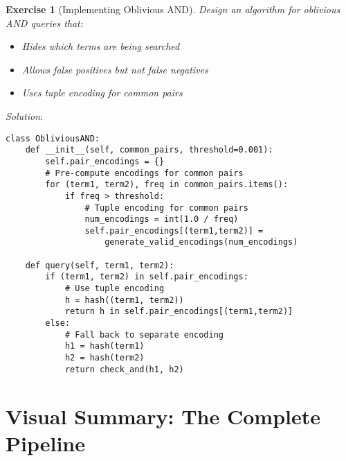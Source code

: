 \documentclass[11pt]{article}
\newtheorem{exercise}{Exercise}[section]
\begin{document}
\begin{exercise}[Implementing Oblivious AND]
Design an algorithm for oblivious AND queries that:
\begin{itemize}
    \item Hides which terms are being searched
    \item Allows false positives but not false negatives
    \item Uses tuple encoding for common pairs
\end{itemize}
\end{exercise}

\textit{Solution}:
\begin{verbatim}
class ObliviousAND:
    def __init__(self, common_pairs, threshold=0.001):
        self.pair_encodings = {}
        # Pre-compute encodings for common pairs
        for (term1, term2), freq in common_pairs.items():
            if freq > threshold:
                # Tuple encoding for common pairs
                num_encodings = int(1.0 / freq)
                self.pair_encodings[(term1,term2)] = 
                    generate_valid_encodings(num_encodings)
    
    def query(self, term1, term2):
        if (term1, term2) in self.pair_encodings:
            # Use tuple encoding
            h = hash((term1, term2))
            return h in self.pair_encodings[(term1,term2)]
        else:
            # Fall back to separate encoding
            h1 = hash(term1)
            h2 = hash(term2)
            return check_and(h1, h2)
\end{verbatim}

\section{Visual Summary: The Complete Pipeline}

\begin{center}
\end{center}
\end{document}

